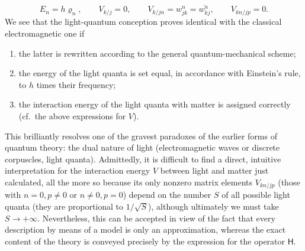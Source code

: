 \documentclass[fontsize=13pt,twoside,openany,headings=normal,parskip=false,bookmarkpackage=false,DIV=calc]{scrbook}
\begin{document}
\[
 E_n=h\varrho_n,\qquad V_{k/j}=0,\qquad V_{k/jn}=w_{jk}^n=\overline{w_{kj}^n},\qquad V_{kn/jp}=0.
\]
We see that the light-quantum conception proves identical with the classical electromagnetic one if
\begin{enumerate}
 \item the latter is rewritten according to the general quantum-mechanical scheme;
 \item the energy of the light quanta is set equal, in accordance with Einstein's rule, to $h$ times their frequency;
 \item the interaction energy of the light quanta with matter is assigned correctly (cf.\ the above expressions for $V$).
\end{enumerate}
This brilliantly resolves one of the gravest paradoxes of the earlier forms of quantum theory: the dual nature of light (electromagnetic waves or discrete corpuscles, light quanta). Admittedly, it is difficult to find a direct, intuitive interpretation for the interaction energy $V$ between light and matter just calculated, all the more so because its only nonzero matrix elements $V_{kn/jp}$ (those with $n=0,p\ne0$ or $n\ne0,p=0$) depend on the number $S$ of all possible light quanta (they are proportional to $1/\sqrt S$), although ultimately we must take $S\longrightarrow+\infty$. Nevertheless, this can be accepted in view of the fact that every description by means of a model is only an approximation, whereas the exact content of the theory is conveyed precisely by the expression for the operator $\mathsf{H}$.
\end{document}
